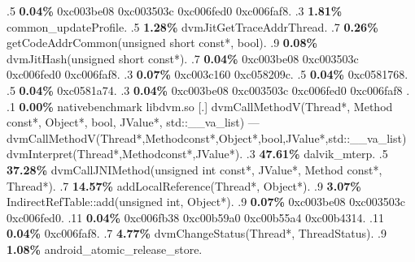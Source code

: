\begin{profile}
{.5 \textbf{0.04\%} 0xc003be08\newline {} 0xc003503c\newline {} 0xc006fed0\newline {} 0xc006faf8. 
.3 \textbf{1.81\%} common\_updateProfile. 
.5 \textbf{1.28\%} dvmJitGetTraceAddrThread. 
.7 \textbf{0.26\%} getCodeAddrCommon(unsigned short const*, bool). 
.9 \textbf{0.08\%} dvmJitHash(unsigned short const*). 
.7 \textbf{0.04\%} 0xc003be08\newline {} 0xc003503c\newline {} 0xc006fed0\newline {} 0xc006faf8. 
.3 \textbf{0.07\%} 0xc003c160\newline {} 0xc058209c. 
.5 \textbf{0.04\%} 0xc0581768. 
.5 \textbf{0.04\%} 0xc0581a74. 
.3 \textbf{0.04\%} 0xc003be08\newline {} 0xc003503c\newline {} 0xc006fed0\newline {} 0xc006faf8\newline {} . 
.1 \textbf{ 0.00\%} nativebenchmark  libdvm.so              [.] dvmCallMethodV(Thread*, Method const*, Object*, bool, JValue*, std::\_\_va\_list)\newline {} ---dvmCallMethodV(Thread*,Methodconst*,Object*,bool,JValue*,std::\_\_va\_list)\newline {} dvmInterpret(Thread*,Methodconst*,JValue*). 
.3 \textbf{47.61\%} dalvik\_mterp. 
.5 \textbf{37.28\%} dvmCallJNIMethod(unsigned int const*, JValue*, Method const*, Thread*). 
.7 \textbf{14.57\%} addLocalReference(Thread*, Object*). 
.9 \textbf{3.07\%} IndirectRefTable::add(unsigned int, Object*). 
.9 \textbf{0.07\%} 0xc003be08\newline {} 0xc003503c\newline {} 0xc006fed0. 
.11 \textbf{0.04\%} 0xc006fb38\newline {} 0xc00b59a0\newline {} 0xc00b55a4\newline {} 0xc00b4314. 
.11 \textbf{0.04\%} 0xc006faf8. 
.7 \textbf{4.77\%} dvmChangeStatus(Thread*, ThreadStatus). 
.9 \textbf{1.08\%} android\_atomic\_release\_store. 
}
\end{profile}
